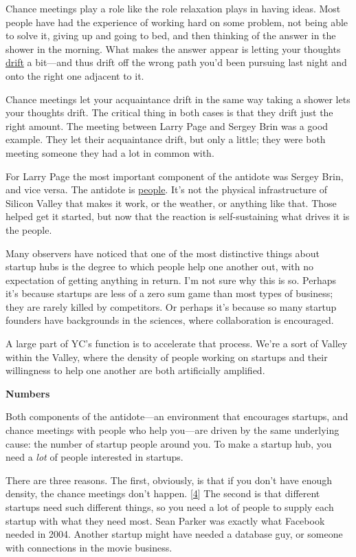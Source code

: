 Chance meetings play a role like the role relaxation plays in having
ideas. Most people have had the experience of working hard on some
problem, not being able to solve it, giving up and going to bed, and
then thinking of the answer in the shower in the morning. What makes the
answer appear is letting your thoughts \href{top.html}{drift} a
bit---and thus drift off the wrong path you'd been pursuing last night
and onto the right one adjacent to it.

Chance meetings let your acquaintance drift in the same way taking a
shower lets your thoughts drift. The critical thing in both cases is
that they drift just the right amount. The meeting between Larry Page
and Sergey Brin was a good example. They let their acquaintance drift,
but only a little; they were both meeting someone they had a lot in
common with.

For Larry Page the most important component of the antidote was Sergey
Brin, and vice versa. The antidote is \href{siliconvalley.html}{people}.
It's not the physical infrastructure of Silicon Valley that makes it
work, or the weather, or anything like that. Those helped get it
started, but now that the reaction is self-sustaining what drives it is
the people.

Many observers have noticed that one of the most distinctive things
about startup hubs is the degree to which people help one another out,
with no expectation of getting anything in return. I'm not sure why this
is so. Perhaps it's because startups are less of a zero sum game than
most types of business; they are rarely killed by competitors. Or
perhaps it's because so many startup founders have backgrounds in the
sciences, where collaboration is encouraged.

A large part of YC's function is to accelerate that process. We're a
sort of Valley within the Valley, where the density of people working on
startups and their willingness to help one another are both artificially
amplified.

\textbf{Numbers}

Both components of the antidote---an environment that encourages
startups, and chance meetings with people who help you---are driven by
the same underlying cause: the number of startup people around you. To
make a startup hub, you need a \emph{lot} of people interested in
startups.

There are three reasons. The first, obviously, is that if you don't have
enough density, the chance meetings don't happen.
{[}\hyperref[f4n]{4}{]} The second is that different startups need such
different things, so you need a lot of people to supply each startup
with what they need most. Sean Parker was exactly what Facebook needed
in 2004. Another startup might have needed a database guy, or someone
with connections in the movie business.

